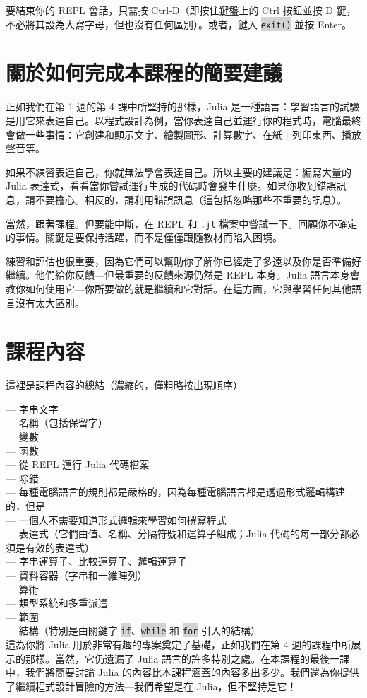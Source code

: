 \documentclass[]{article}
\newcommand{\codequote}[1]{\colorbox{lightgray}{\tt #1}}
\begin{document}
要結束你的 REPL 會話，只需按 Ctrl-D（即按住鍵盤上的 Ctrl 按鈕並按 D 鍵，不必將其設為大寫字母，但也沒有任何區別）。或者，鍵入 \codequote{exit()} 並按 Enter。

\section*{關於如何完成本課程的簡要建議}

正如我們在第 1 週的第 4 課中所堅持的那樣，Julia 是一種語言：學習語言的試驗是用它來表達自己。以程式設計為例，當你表達自己並運行你的程式時，電腦最終會做一些事情：它創建和顯示文字、繪製圖形、計算數字、在紙上列印東西、播放聲音等。

如果不練習表達自己，你就無法學會表達自己。所以主要的建議是：編寫大量的 Julia 表達式，看看當你嘗試運行生成的代碼時會發生什麼。如果你收到錯誤訊息，請不要擔心。相反的，請利用錯誤訊息（這包括忽略那些不重要的訊息）。

當然，跟著課程。但要能中斷，在 REPL 和 {\tt .jl} 檔案中嘗試一下。回顧你不確定的事情。關鍵是要保持活躍，而不是僅僅跟隨教材而陷入困境。

練習和評估也很重要，因為它們可以幫助你了解你已經走了多遠以及你是否準備好繼續。他們給你反饋---但最重要的反饋來源仍然是 REPL 本身。Julia 語言本身會教你如何使用它---你所要做的就是繼續和它對話。在這方面，它與學習任何其他語言沒有太大區別。

\section*{課程內容}
這裡是課程內容的總結（濃縮的，僅粗略按出現順序）

--- 字串文字\\
--- 名稱（包括保留字）\\
--- 變數 \\
--- 函數 \\
--- 從 REPL 運行 Julia 代碼檔案 \\
--- 除錯 \\
--- 每種電腦語言的規則都是嚴格的，因為每種電腦語言都是透過形式邏輯構建的，但是 \\
--- 一個人不需要知道形式邏輯來學習如何撰寫程式 \\
--- 表達式（它們由值、名稱、分隔符號和運算子組成；Julia 代碼的每一部分都必須是有效的表達式）\\
--- 字串運算子、比較運算子、邏輯運算子 \\
--- 資料容器（字串和一維陣列）\\
--- 算術 \\
--- 類型系統和多重派遣 \\
--- 範圍 \\
--- 結構（特別是由關鍵字 \codequote{if}、\codequote{while} 和 \codequote{for} 引入的結構）\\

這為你將 Julia 用於非常有趣的專案奠定了基礎，正如我們在第 4 週的課程中所展示的那樣。當然，它仍遺漏了 Julia 語言的許多特別之處。在本課程的最後一課中，我們將簡要討論 Julia 的內容比本課程涵蓋的內容多出多少。我們還為你提供了繼續程式設計冒險的方法---我們希望是在 Julia，但不堅持是它！
\end{document}
